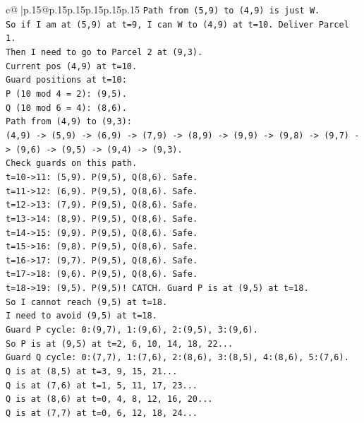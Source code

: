 \documentclass{article}
\begin{document}
{\begin{supertabular}{c@{$\;$}|p{.15\linewidth}@{}p{.15\linewidth}p{.15\linewidth}p{.15\linewidth}p{.15\linewidth}p{.15\linewidth}}
{{{\texttt{Path from (5,9) to (4,9) is just W.} \\
\texttt{So if I am at (5,9) at t=9, I can W to (4,9) at t=10. Deliver Parcel 1.} \\
\texttt{Then I need to go to Parcel 2 at (9,3).} \\
\texttt{Current pos (4,9) at t=10.} \\
\texttt{Guard positions at t=10:} \\
\texttt{P (10 mod 4 = 2): (9,5).} \\
\texttt{Q (10 mod 6 = 4): (8,6).} \\
\texttt{Path from (4,9) to (9,3):} \\
\texttt{(4,9) {-}> (5,9) {-}> (6,9) {-}> (7,9) {-}> (8,9) {-}> (9,9) {-}> (9,8) {-}> (9,7) {-}> (9,6) {-}> (9,5) {-}> (9,4) {-}> (9,3).} \\
\texttt{Check guards on this path.} \\
\texttt{t=10{-}>11: (5,9). P(9,5), Q(8,6). Safe.} \\
\texttt{t=11{-}>12: (6,9). P(9,5), Q(8,6). Safe.} \\
\texttt{t=12{-}>13: (7,9). P(9,5), Q(8,6). Safe.} \\
\texttt{t=13{-}>14: (8,9). P(9,5), Q(8,6). Safe.} \\
\texttt{t=14{-}>15: (9,9). P(9,5), Q(8,6). Safe.} \\
\texttt{t=15{-}>16: (9,8). P(9,5), Q(8,6). Safe.} \\
\texttt{t=16{-}>17: (9,7). P(9,5), Q(8,6). Safe.} \\
\texttt{t=17{-}>18: (9,6). P(9,5), Q(8,6). Safe.} \\
\texttt{t=18{-}>19: (9,5). P(9,5)! CATCH. Guard P is at (9,5) at t=18.} \\
\texttt{So I cannot reach (9,5) at t=18.} \\
\texttt{I need to avoid (9,5) at t=18.} \\
\texttt{Guard P cycle: 0:(9,7), 1:(9,6), 2:(9,5), 3:(9,6).} \\
\texttt{So P is at (9,5) at t=2, 6, 10, 14, 18, 22...} \\
\texttt{Guard Q cycle: 0:(7,7), 1:(7,6), 2:(8,6), 3:(8,5), 4:(8,6), 5:(7,6).} \\
\texttt{Q is at (8,5) at t=3, 9, 15, 21...} \\
\texttt{Q is at (7,6) at t=1, 5, 11, 17, 23...} \\
\texttt{Q is at (8,6) at t=0, 4, 8, 12, 16, 20...} \\
\texttt{Q is at (7,7) at t=0, 6, 12, 18, 24...} \\
}}}
\end{supertabular}}
\end{document}
